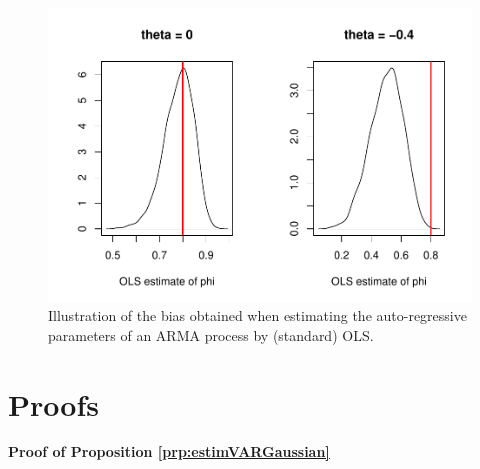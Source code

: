 \documentclass[
  12pt,
]{book}
\theoremstyle{definition}
\theoremstyle{definition}
\theoremstyle{definition}
\theoremstyle{definition}
\theoremstyle{remark}
\begin{document}
\begin{figure}
\includegraphics[width=0.95\linewidth]{IdentifStructShocks_files/figure-latex/simulARMAbiased-1} \caption{Illustration of the bias obtained when estimating the auto-regressive parameters of an ARMA process by (standard) OLS.}\label{fig:simulARMAbiased}
\end{figure}

\section{Proofs}\label{AppendixProof}

\textbf{Proof of Proposition \ref{prp:estimVARGaussian}}
\end{document}
